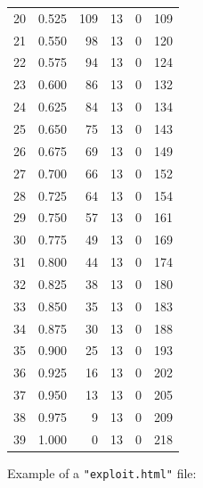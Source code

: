 \documentclass[a4paper,twoside,12pt]{book}
\begin{document}
\begin{appendices}
\begin{table}
\begin{tabular}{lrrrrr}
		20 &  0.525 &       109 &        13 &               0 &             109 \\
		21 &  0.550 &        98 &        13 &               0 &             120 \\
		22 &  0.575 &        94 &        13 &               0 &             124 \\
		23 &  0.600 &        86 &        13 &               0 &             132 \\
		24 &  0.625 &        84 &        13 &               0 &             134 \\
		25 &  0.650 &        75 &        13 &               0 &             143 \\
		26 &  0.675 &        69 &        13 &               0 &             149 \\
		27 &  0.700 &        66 &        13 &               0 &             152 \\
		28 &  0.725 &        64 &        13 &               0 &             154 \\
		29 &  0.750 &        57 &        13 &               0 &             161 \\
		30 &  0.775 &        49 &        13 &               0 &             169 \\
		31 &  0.800 &        44 &        13 &               0 &             174 \\
		32 &  0.825 &        38 &        13 &               0 &             180 \\
		33 &  0.850 &        35 &        13 &               0 &             183 \\
		34 &  0.875 &        30 &        13 &               0 &             188 \\
		35 &  0.900 &        25 &        13 &               0 &             193 \\
		36 &  0.925 &        16 &        13 &               0 &             202 \\
		37 &  0.950 &        13 &        13 &               0 &             205 \\
		38 &  0.975 &         9 &        13 &               0 &             209 \\
		39 &  1.000 &         0 &        13 &               0 &             218 \\
		\bottomrule
	\end{tabular}
\end{table} 

Example of a \lstinline|"exploit.html"| file:

\begin{lstlisting}


\end{lstlisting}
\end{appendices}
\end{document}
